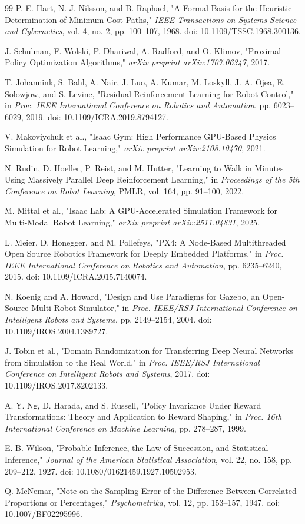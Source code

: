 \documentclass[10pt,twocolumn]{article}
\begin{document}
\begin{thebibliography}{99}
P. E. Hart, N. J. Nilsson, and B. Raphael,
"A Formal Basis for the Heuristic Determination of Minimum Cost Paths,"
\emph{IEEE Transactions on Systems Science and Cybernetics}, vol. 4, no. 2,
pp. 100--107, 1968. doi: 10.1109/TSSC.1968.300136.

J. Schulman, F. Wolski, P. Dhariwal, A. Radford, and O. Klimov,
"Proximal Policy Optimization Algorithms,"
\emph{arXiv preprint arXiv:1707.06347}, 2017.

T. Johannink, S. Bahl, A. Nair, J. Luo, A. Kumar, M. Loskyll,
J. A. Ojea, E. Solowjow, and S. Levine,
"Residual Reinforcement Learning for Robot Control,"
in \emph{Proc. IEEE International Conference on Robotics and Automation},
pp. 6023--6029, 2019. doi: 10.1109/ICRA.2019.8794127.

V. Makoviychuk et al.,
"Isaac Gym: High Performance GPU-Based Physics Simulation for Robot Learning,"
\emph{arXiv preprint arXiv:2108.10470}, 2021.

N. Rudin, D. Hoeller, P. Reist, and M. Hutter,
"Learning to Walk in Minutes Using Massively Parallel Deep Reinforcement Learning,"
in \emph{Proceedings of the 5th Conference on Robot Learning},
PMLR, vol. 164, pp. 91--100, 2022.

M. Mittal et al.,
"Isaac Lab: A GPU-Accelerated Simulation Framework for Multi-Modal Robot Learning,"
\emph{arXiv preprint arXiv:2511.04831}, 2025.

L. Meier, D. Honegger, and M. Pollefeys,
"PX4: A Node-Based Multithreaded Open Source Robotics Framework for Deeply Embedded Platforms,"
in \emph{Proc. IEEE International Conference on Robotics and Automation},
pp. 6235--6240, 2015. doi: 10.1109/ICRA.2015.7140074.

N. Koenig and A. Howard,
"Design and Use Paradigms for Gazebo, an Open-Source Multi-Robot Simulator,"
in \emph{Proc. IEEE/RSJ International Conference on Intelligent Robots and Systems},
pp. 2149--2154, 2004. doi: 10.1109/IROS.2004.1389727.

J. Tobin et al.,
"Domain Randomization for Transferring Deep Neural Networks from Simulation to the Real World,"
in \emph{Proc. IEEE/RSJ International Conference on Intelligent Robots and Systems},
2017. doi: 10.1109/IROS.2017.8202133.

A. Y. Ng, D. Harada, and S. Russell,
"Policy Invariance Under Reward Transformations: Theory and Application to Reward Shaping,"
in \emph{Proc. 16th International Conference on Machine Learning},
pp. 278--287, 1999.

E. B. Wilson,
"Probable Inference, the Law of Succession, and Statistical Inference,"
\emph{Journal of the American Statistical Association}, vol. 22, no. 158,
pp. 209--212, 1927. doi: 10.1080/01621459.1927.10502953.

Q. McNemar,
"Note on the Sampling Error of the Difference Between Correlated Proportions or Percentages,"
\emph{Psychometrika}, vol. 12, pp. 153--157, 1947.
doi: 10.1007/BF02295996.
\end{thebibliography}
\end{document}
